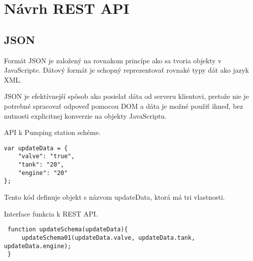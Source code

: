 \chapter{Návrh \acs{REST} \acs{API}}



\section{\acs{JSON}}



Formát \ac{JSON} je založený na rovnakom princípe ako sa tvoria objekty v JavaScripte. Dátový formát je schopný reprezentovať rovnaké typy dát ako jazyk \acs{XML}. \cite[p.~622-4]{Zakas}

JSON je efektívnejší spôsob ako posielať dáta od serveru klientovi, pretože nie je potrebné spracovať odpoveď pomocou \acs{DOM} a dáta je možné použiť ihneď, bez nutnosti explicitnej konverzie na objekty JavaScriptu. \cite[p.~280]{Suehring}











%
%



API k Pumping station schéme. 

\begin{lstlisting}
var updateData = {
	"valve": "true",
	"tank": "20",
	"engine": "20"
};
\end{lstlisting}

Tento kód definuje objekt s názvom updateData, ktorá má tri vlastnosti. 




 Interface funkcia k REST API. 
 
 \begin{lstlisting}
 function updateSchema(updateData){
	 updateSchema01(updateData.valve, updateData.tank, updateData.engine);
 }
 \end{lstlisting}
